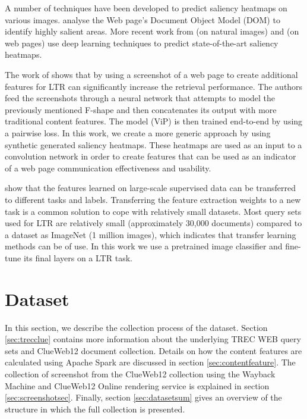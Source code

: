 A number of techniques have been developed to predict saliency heatmaps on various images. \citet{buscher2009you} analyse the Web page's Document Object Model (DOM) to identify highly salient areas. More recent work from \citet{kummerer2016deepgaze} (on natural images) and \citet{shan2017two} (on web pages) use deep learning techniques to predict state-of-the-art saliency heatmaps. 

The work of \citet{fan2017learning} shows that by using a screenshot of a web page to create additional features for \ac{LTR} can significantly increase the retrieval performance. The authors feed the screenshots through a neural network that attempts to model the previously mentioned F-shape and then concatenates its output with more traditional content features. The model (ViP) is then trained end-to-end by using a pairwise loss. In this work, we create a more generic approach by using synthetic generated saliency heatmaps. These heatmaps are used as an input to a convolution network in order to create features that can be used as an indicator of a web page communication effectiveness and usability. 

\citet{donahue2014decaf} show that the features learned on large-scale supervised data can be transferred to different tasks and labels. Transferring the feature extraction weights to a new task is a common solution to cope with relatively small datasets. Most query sets used for \ac{LTR} are relatively small (approximately 30,000 documents) compared to a dataset as ImageNet (1 million images), which indicates that transfer learning methods can be of use. In this work we use a pretrained image classifier and fine-tune its final layers on a \ac{LTR} task. 



\section{Dataset}\label{sec:dataset}
In this section, we describe the collection process of the \datasetname dataset. Section \ref{sec:trecclue} contains more information about the underlying TREC WEB query sets and ClueWeb12 document collection. Details on how the content features are calculated using Apache Spark are discussed in section \ref{sec:contentfeature}. The collection of screenshot from the ClueWeb12 collection using the Wayback Machine and ClueWeb12 Online rendering service is explained in section \ref{sec:screenshotsec}. Finally, section \ref{sec:datasetsum} gives an overview of the structure in which the full collection is presented.

